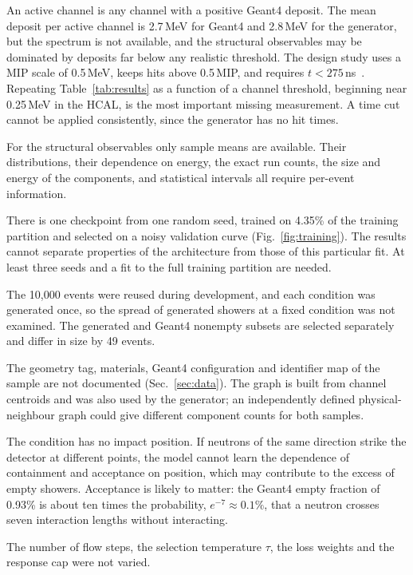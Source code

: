 \documentclass[11pt]{article}
\begin{document}
\begin{description}[leftmargin=1.2em,itemsep=3pt]
 \item[No readout threshold.] An active channel is any channel with a positive Geant4 deposit. The mean deposit per active channel is 2.7\,MeV for Geant4 and 2.8\,MeV for the generator, but the spectrum is not available, and the structural observables may be dominated by deposits far below any realistic threshold. The design study uses a MIP scale of 0.5\,MeV, keeps hits above 0.5\,MIP, and requires $t<275$\,ns~\cite{epiczdc}. Repeating Table~\ref{tab:results} as a function of a channel threshold, beginning near 0.25\,MeV in the HCAL, is the most important missing measurement. A time cut cannot be applied consistently, since the generator has no hit times.
 \item[Means only.] For the structural observables only sample means are available. Their distributions, their dependence on energy, the exact run counts, the size and energy of the components, and statistical intervals all require per-event information.
 \item[One training run.] There is one checkpoint from one random seed, trained on 4.35\% of the training partition and selected on a noisy validation curve (Fig.~\ref{fig:training}). The results cannot separate properties of the architecture from those of this particular fit. At least three seeds and a fit to the full training partition are needed.
 \item[Evaluation sample.] The 10,000 events were reused during development, and each condition was generated once, so the spread of generated showers at a fixed condition was not examined. The generated and Geant4 nonempty subsets are selected separately and differ in size by 49 events.
 \item[Detector description.] The geometry tag, materials, Geant4 configuration and identifier map of the sample are not documented (Sec.~\ref{sec:data}). The graph is built from channel centroids and was also used by the generator; an independently defined physical-neighbour graph could give different component counts for both samples.
 \item[Conditioning.] The condition has no impact position. If neutrons of the same direction strike the detector at different points, the model cannot learn the dependence of containment and acceptance on position, which may contribute to the excess of empty showers. Acceptance is likely to matter: the Geant4 empty fraction of 0.93\% is about ten times the probability, $e^{-7}\approx0.1\%$, that a neutron crosses seven interaction lengths without interacting.
 \item[Unstudied settings.] The number of flow steps, the selection temperature $\tau$, the loss weights and the response cap were not varied.
\end{description}
\end{document}
